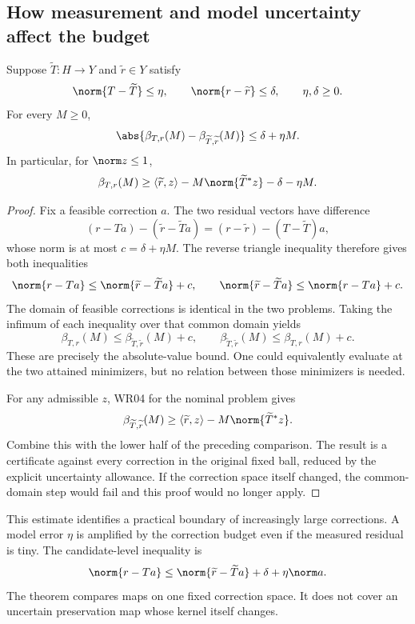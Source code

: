 \subsection{How measurement and model uncertainty affect the budget}
\begin{theorem}\label{WR05}
Suppose $\widetilde T:H\to Y$ and $\widetilde r\in Y$ satisfy
\[
 \norm{T-\widetilde T}\le\eta,\qquad
 \norm{r-\widetilde r}\le\delta,\qquad\eta,\delta\ge0.
\]
For every $M\ge0$,
\[
 \abs{\beta_{T,r}(M)-\beta_{\widetilde T,\widetilde r}(M)}
 \le\delta+\eta M.
\]
In particular, for $\norm z\le1$,
\[
 \beta_{T,r}(M)\ge
 \langle\widetilde r,z\rangle-M\norm{\widetilde T^*z}
       -\delta-\eta M.
\]
\end{theorem}
\begin{proof}
Fix a feasible correction $a$. The two residual vectors have difference
\[
 (r-Ta)-(\widetilde r-\widetilde Ta)
 =(r-\widetilde r)-(T-\widetilde T)a,
\]
whose norm is at most $c=\delta+\eta M$. The reverse triangle inequality therefore gives both inequalities
\[
 \norm{r-Ta}\le\norm{\widetilde r-\widetilde Ta}+c,
 \qquad
 \norm{\widetilde r-\widetilde Ta}\le\norm{r-Ta}+c.
\]
The domain of feasible corrections is identical in the two problems. Taking the infimum of each inequality over that common domain yields
\[
 \beta_{T,r}(M)\le\beta_{\widetilde T,\widetilde r}(M)+c,
 \qquad
 \beta_{\widetilde T,\widetilde r}(M)\le\beta_{T,r}(M)+c.
\]
These are precisely the absolute-value bound. One could equivalently evaluate at the two attained minimizers, but no relation between those minimizers is needed.

For any admissible $z$, WR04 for the nominal problem gives
\[
 \beta_{\widetilde T,\widetilde r}(M)
 \ge\langle\widetilde r,z\rangle-M\norm{\widetilde T^*z}.
\]
Combine this with the lower half of the preceding comparison. The result is a certificate against every correction in the original fixed ball, reduced by the explicit uncertainty allowance. If the correction space itself changed, the common-domain step would fail and this proof would no longer apply.
\end{proof}

This estimate identifies a practical boundary of increasingly large corrections. A model error $\eta$ is amplified by the correction budget even if the measured residual is tiny. The candidate-level inequality is
\[
 \norm{r-Ta}\le\norm{\widetilde r-\widetilde Ta}+\delta+\eta\norm a.
\]
The theorem compares maps on one fixed correction space. It does not cover an uncertain preservation map whose kernel itself changes.

